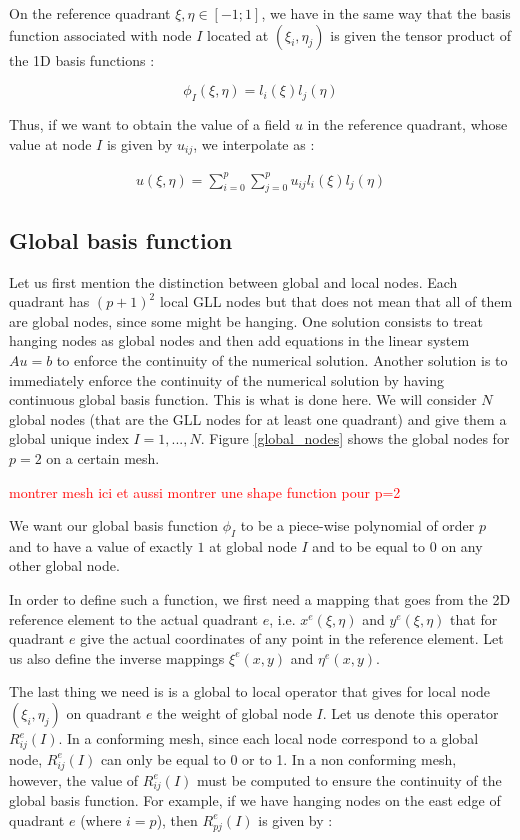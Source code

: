 On the reference quadrant $\xi, \eta \in [-1;1]$, we have in the same way that the basis function associated with node $I$ located at $(\xi_i,\eta_j)$ is given the tensor product of the 1D basis functions : 

$$\phi_I(\xi,\eta) = l_i(\xi)l_j(\eta)$$

Thus, if we want to obtain the value of a field $u$ in the reference quadrant, whose value at node $I$ is given by $u_{ij}$, we interpolate as : 

\begin{align*}
u(\xi,\eta) = \sum_{i=0}^p\sum_{j=0}^p u_{ij}l_i(\xi)l_j(\eta)
\end{align*}

\subsection{Global basis function}

Let us first mention the distinction between global and local nodes. Each quadrant has $(p+1)^2$ local GLL nodes but that does not mean that all of them are global nodes, since some might be hanging. One solution consists to treat hanging nodes as global nodes and then add equations in the linear system $Au=b$ to enforce the continuity of the numerical solution. Another solution is to immediately enforce the continuity of the numerical solution by having continuous global basis function. This is what is done here. We will consider $N$ global nodes (that are the GLL nodes for at least one quadrant) and give them a global unique index $I = 1,...,N$. Figure \ref{global_nodes} shows the global nodes for $p=2$ on a certain mesh. 

\textcolor{red}{montrer mesh ici et aussi montrer une shape function pour p=2}


We want our global basis function $\phi_I$ to be a piece-wise polynomial of order $p$ and to have a value of exactly $1$ at global node $I$ and to be equal to $0$ on any other global node. 

In order to define such a function, we first need a mapping that goes from the 2D reference element to the actual quadrant $e$, i.e. $x^e(\xi,\eta)$ and $y^e(\xi,\eta)$ that for quadrant $e$ give the actual coordinates of any point in the reference element. Let us also define the inverse mappings $\xi^e(x,y)$ and $\eta^e(x,y)$. 

The last thing we need is is a global to local operator that gives for local node $(\xi_i,\eta_j)$ on quadrant $e$ the weight of global node $I$. Let us denote this operator $R^e_{ij}(I)$. In a conforming mesh, since each local node correspond to a global node, $R^e_{ij}(I)$ can only be equal to 0 or to 1. In a non conforming mesh, however, the value of $R^e_{ij}(I)$ must be computed to ensure the continuity of the global basis function. For example, if we have hanging nodes on the east edge of quadrant $e$ (where $i=p$), then $R^e_{pj}(I)$ is given by : 

